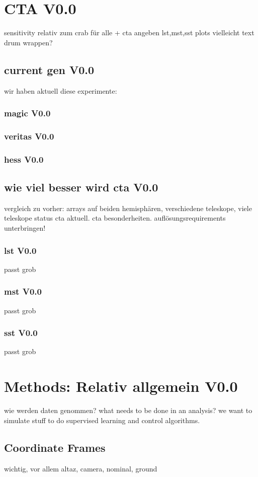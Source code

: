 \chapter{CTA V0.0}
sensitivity relativ zum crab für alle + cta angeben 
lst,mst,sst plots vielleicht text drum wrappen?
\section{current gen V0.0}
wir haben aktuell diese experimente:
\subsection{magic V0.0}
\subsection{veritas V0.0}
\subsection{hess V0.0}
\section{wie viel besser wird cta V0.0}
vergleich zu vorher: arrays auf beiden hemisphären, verschiedene teleskope, viele teleskope
status cta aktuell.
cta besonderheiten.
auflösungsrequirements unterbringen!
\subsection{lst V0.0}
passt grob
\subsection{mst V0.0}
passt grob
\subsection{sst V0.0}
passt grob

\chapter{Methods: Relativ allgemein V0.0}
wie werden daten genommen?
what needs to be done in an analysis?
we want to simulate stuff to do supervised learning and control algorithms.
\section{Coordinate Frames}
wichtig, vor allem altaz, camera, nominal, ground
